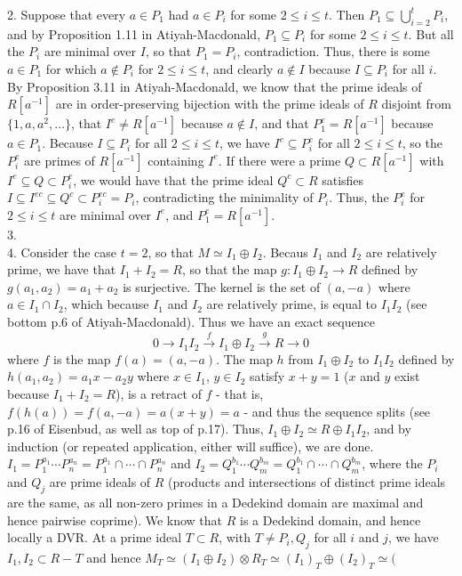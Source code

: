 \documentclass[11pt]{article}
\begin{document}
\num{2.} Suppose that every $a\in P_1$ had $a\in P_i$ for some $2\leq
i\leq t$. Then $P_1\subseteq\bigcup_{i=2}^t P_i$, and by Proposition 1.11
in Atiyah-Macdonald, $P_1\subseteq P_i$ for some $2\leq i\leq t$. But all
the $P_i$ are minimal over $I$, so that $P_1=P_i$, contradiction. Thus,
there is some $a\in P_1$ for which $a\notin P_i$ for $2\leq i\leq t$, and
clearly $a\notin I$ because $I\subseteq P_i$ for all $i$. By Proposition
3.11 in Atiyah-Macdonald, we know that the prime ideals of $R[a^{-1}]$
are in order-preserving bijection with the prime ideals of $R$ disjoint
from $\{1,a,a^2,\ldots\}$, that $I^e\neq R[a^{-1}]$ because $a\notin I$,
and that $P_1^e= R[a^{-1}]$ because $a\in P_1$. Because $I\subseteq P_i$ for
all $2\leq i\leq t$, we have $I^e\subseteq P_i^e$ for all $2\leq i\leq t$,
so the $P_i^e$ are primes of $R[a^{-1}]$ containing $I^e$. If there were a
prime $Q\subset R[a^{-1}]$ with $I^e\subseteq Q\subset P_i^e$, we would have
that the prime ideal $Q^c\subset R$ satisfies $I\subseteq I^{ec}\subseteq
Q^c\subset P_i^{ec}=P_i$, contradicting the minimality of $P_i$. Thus, the
$P_i^e$ for $2\leq i\leq t$ are minimal over $I^e$, and $P_1^e=R[a^{-1}]$.  \\

\num{3.}     \\

\num{4.} Consider the case $t=2$, so that $M\simeq I_1\oplus I_2$. Becaus
$I_1$ and $I_2$ are relatively prime, we have that $I_1+I_2=R$, so that
the map $g:I_1\oplus I_2\rightarrow R$ defined by $g(a_1,a_2)=a_1+a_2$
is surjective. The kernel is the set of $(a,-a)$ where $a\in I_1\cap I_2$,
which because $I_1$ and $I_2$ are relatively prime, is equal to $I_1I_2$
(see bottom p.6 of Atiyah-Macdonald). Thus we have an exact sequence
\[0\rightarrow I_1I_2\stackrel{f}{\rightarrow} I_1\oplus
I_2\stackrel{g}{\rightarrow} R\rightarrow 0\]
where $f$ is the map $f(a)=(a,-a)$. The map $h$ from $I_1\oplus I_2$ to
$I_1I_2$ defined by $h(a_1,a_2)=a_1x-a_2y$ where $x\in I_1$, $y\in I_2$
satisfy $x+y=1$ ($x$ and $y$ exist because $I_1+I_2=R$), is a retract of $f$
- that is, $f(h(a))=f(a,-a)=a(x+y)=a$ - and thus the sequence splits (see
p.16 of Eisenbud, as well as top of p.17). Thus, $I_1\oplus I_2\simeq R\oplus
I_1I_2$, and by induction (or repeated application, either will suffice),
we are done.\\

$I_1=P_1^{a_1}\cdots P_n^{a_n}=P_1^{a_1}\cap\cdots\cap P_n^{a_n}$ and
$I_2=Q_1^{b_1}\cdots Q_m^{b_m} = Q_1^{b_1}\cap\cdots\cap Q_m^{b_m}$, where
the $P_i$ and $Q_j$ are prime ideals of $R$ (products and intersections
of distinct prime ideals are the same, as all non-zero primes in a Dedekind
domain are maximal and hence pairwise coprime). We know that $R$ is a Dedekind
domain, and hence locally a DVR. At a prime ideal $T\subset R$, with $T\neq
P_i, Q_j$ for all $i$ and $j$, we have $I_1,I_2\subset R-T$ and hence
$M_T\simeq(I_1\oplus I_2)\otimes R_T\simeq (I_1)_T\oplus (I_2)_T\simeq($    \\
\end{document}
